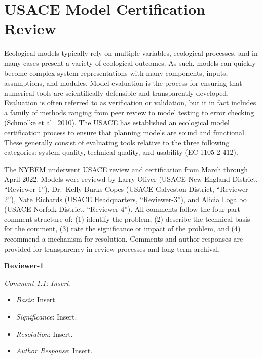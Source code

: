 \documentclass[
]{book}
\providecommand{\tightlist}{%
  \setlength{\itemsep}{0pt}\setlength{\parskip}{0pt}}
\begin{document}
\hypertarget{usace-model-certification-review}{%
\chapter{USACE Model Certification Review}\label{usace-model-certification-review}}

Ecological models typically rely on multiple variables, ecological processes, and in many cases present a variety of ecological outcomes. As such, models can quickly become complex system representations with many components, inputs, assumptions, and modules. Model evaluation is the process for ensuring that numerical tools are scientifically defensible and transparently developed. Evaluation is often referred to as verification or validation, but it in fact includes a family of methods ranging from peer review to model testing to error checking (Schmolke et al.~2010). The USACE has established an ecological model certification process to ensure that planning models are sound and functional. These generally consist of evaluating tools relative to the three following categories: system quality, technical quality, and usability (EC 1105-2-412).

The NYBEM underwent USACE review and certification from March through April 2022. Models were reviewd by Larry Oliver (USACE New England District, ``Reviewer-1''), Dr.~Kelly Burks-Copes (USACE Galveston District, ``Reviewer-2''), Nate Richards (USACE Headquarters, ``Reviewer-3''), and Alicia Logalbo (USACE Norfolk District, ``Reviewer-4''). All comments follow the four-part comment structure of: (1) identify the problem, (2) describe the technical basis for the comment, (3) rate the significance or impact of the problem, and (4) recommend a mechanism for resolution. Comments and author responses are provided for transparency in review processes and long-term archival.

\textbf{Reviewer-1}

\emph{Comment 1.1: Insert.}

\begin{itemize}
\tightlist
\item
  \emph{Basis}: Insert.\\
\item
  \emph{Significance}: Insert.\\
\item
  \emph{Resolution}: Insert.\\
\item
  \emph{Author Response}: Insert.
\end{itemize}
\end{document}
